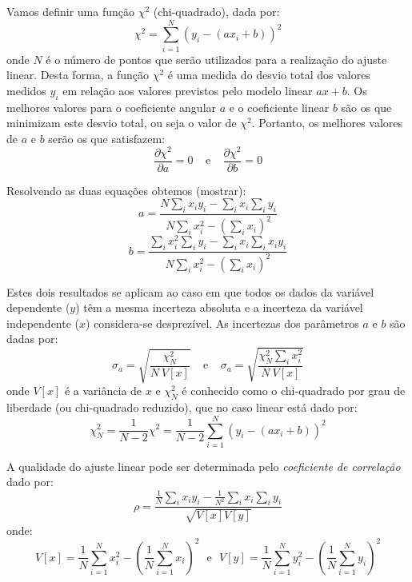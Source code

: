 Vamos definir uma função $\chi^2$ (chi-quadrado), dada por: 
\begin{equation}
\chi^2 = \sum_{i=1}^N (y_i - (ax_i + b))^2
\end{equation}
\noindent
onde $N$ é o número de pontos que serão utilizados para a realização do ajuste linear. Desta forma, a função $\chi^2$ é uma medida do desvio total dos valores medidos $y_i$ em relação aos valores previstos pelo modelo linear $ax + b$. Os melhores valores para o coeficiente angular $a$ e o coeficiente linear $b$ são os que minimizam este desvio total, ou seja o valor de $\chi^2$. Portanto, os melhores valores de $a$ e $b$ serão os que satisfazem:
\begin{equation}
\frac{\partial \chi^2}{\partial a} = 0~~~~~ \text{e}~~~~~ \frac{\partial \chi^2}{\partial b} = 0
\end{equation}

Resolvendo as duas equações obtemos (mostrar):
\begin{equation}
a = \frac{N\sum_i x_i y_i - \sum_i x_i \sum_i y_i}{N \sum_i x_i^2 - (\sum_i x_i)^2}
\end{equation}
\begin{equation}
b = \frac{\sum_i x_i^2 \sum_i y_i - \sum_i x_i \sum_i x_i y_i}{N \sum_i x_i^2 - (\sum_i x_i)^2}
\end{equation}

Estes dois resultados se aplicam ao caso em que todos os dados da variável dependente ($y$) têm a mesma incerteza absoluta e a incerteza da variável independente ($x$) considera-se desprezível. As incertezas dos parâmetros $a$ e $b$ são dadas por:
\begin{equation}
\sigma_a = \sqrt{\frac{\chi_N^2}{N~V[x]}} ~~~~~ \text{e}~~~~~ \sigma_a = \sqrt{\frac{\chi_N^2 \sum_i x_i^2}{N~V[x]}}
\end{equation}
\noindent
onde $V[x]$ é a variância de $x$ e $\chi^2_N$ é conhecido como o chi-quadrado por grau de liberdade (ou chi-quadrado reduzido), que no caso linear está dado por:
\begin{equation}
\chi^2_N = \frac{1}{N-2} \chi^2 = \frac{1}{N-2} \sum_{i=1}^N (y_i - (ax_i + b))^2
\end{equation}

A qualidade do ajuste linear pode ser determinada pelo {\it coeficiente de correlação} dado por:
\begin{equation}
\rho = \frac{\frac{1}{N} \sum_i x_i y_i - \frac{1}{N^2} \sum_i x_i \sum_i y_i}{\sqrt{V[x] V[y]}}
\end{equation}
\noindent
onde:
\begin{equation}
V[x] = \frac{1}{N} \sum_{i=1}^N x_i^2 - \left( \frac{1}{N} \sum_{i=1}^N x_i \right) ^2 ~~~ \text{e}~~~V[y] = \frac{1}{N} \sum_{i=1}^N y_i^2 - \left(  \frac{1}{N} \sum_{i=1}^N y_i \right)^2
\end{equation}



